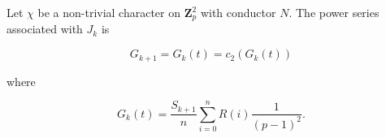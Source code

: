 Let $\chi$ be a non-trivial character on $\mathbf{Z}_p^2$ with conductor $N$. The power series associated with $J_k$ is

$$G_{k+1} = G_k(t) = c_2(G_k(t))$$

where

$$G_k(t) = \frac{S_{k+1}}{n} \sum_{i=0}^{n} R(i) \frac{1}{(p-1)^2}.$$

